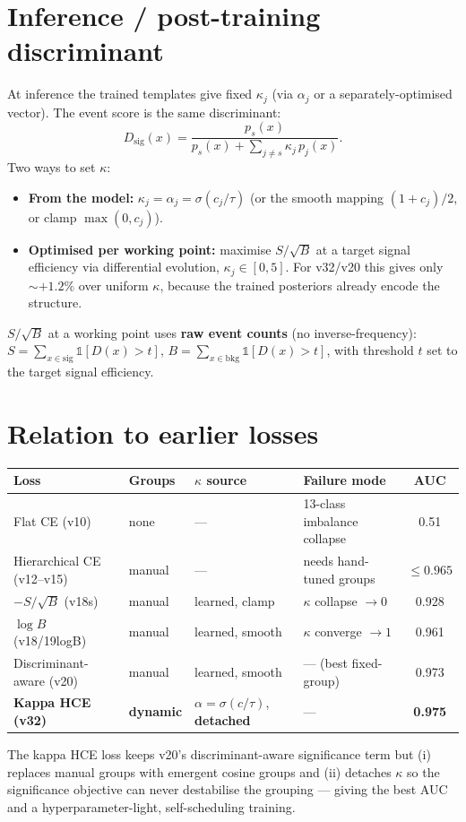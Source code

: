 \documentclass[11pt]{article}
\begin{document}
\section{Inference / post-training discriminant}
At inference the trained templates give fixed $\kappa_j$ (via $\alpha_j$ or a
separately-optimised vector). The event score is the same discriminant:
\begin{equation}
D_\text{sig}(x) = \frac{p_s(x)}{p_s(x) + \sum_{j\ne s}\kappa_j\, p_j(x)} .
\end{equation}
Two ways to set $\kappa$:
\begin{itemize}[nosep]
  \item \textbf{From the model:} $\kappa_j = \alpha_j = \sigma(c_j/\tau)$ (or the smooth mapping
        $(1+c_j)/2$, or clamp $\max(0,c_j)$).
  \item \textbf{Optimised per working point:} maximise $S/\sqrt{B}$ at a target signal efficiency
        via differential evolution, $\kappa_j \in [0,5]$. For v32/v20 this gives only
        $\sim{+}1.2\%$ over uniform $\kappa$, because the trained posteriors already encode the
        structure.
\end{itemize}
$S/\sqrt{B}$ at a working point uses \textbf{raw event counts} (no inverse-frequency):
$S = \sum_{x\in\text{sig}} \mathbb{1}[D(x)>t]$,
$B = \sum_{x\in\text{bkg}} \mathbb{1}[D(x)>t]$, with threshold $t$ set to the target signal
efficiency.

\section{Relation to earlier losses}
\begin{center}
\renewcommand{\arraystretch}{1.2}
\begin{tabular}{@{}l l l l c@{}}
\toprule
\textbf{Loss} & \textbf{Groups} & \textbf{$\kappa$ source} & \textbf{Failure mode} & \textbf{AUC} \\
\midrule
Flat CE (v10)              & none    & ---            & 13-class imbalance collapse & 0.51 \\
Hierarchical CE (v12--v15) & manual  & ---            & needs hand-tuned groups     & $\le 0.965$ \\
$-S/\sqrt B$ (v18s)        & manual  & learned, clamp & $\kappa$ collapse $\to 0$    & 0.928 \\
$\log B$ (v18/19logB)      & manual  & learned, smooth& $\kappa$ converge $\to 1$    & 0.961 \\
Discriminant-aware (v20)   & manual  & learned, smooth& --- (best fixed-group)      & 0.973 \\
\textbf{Kappa HCE (v32)}   & \textbf{dynamic} & $\alpha=\sigma(c/\tau)$, \textbf{detached} & --- & \textbf{0.975} \\
\bottomrule
\end{tabular}
\end{center}
The kappa HCE loss keeps v20's discriminant-aware significance term but (i) replaces manual groups
with emergent cosine groups and (ii) detaches $\kappa$ so the significance objective can never
destabilise the grouping --- giving the best AUC and a hyperparameter-light, self-scheduling
training.
\end{document}
